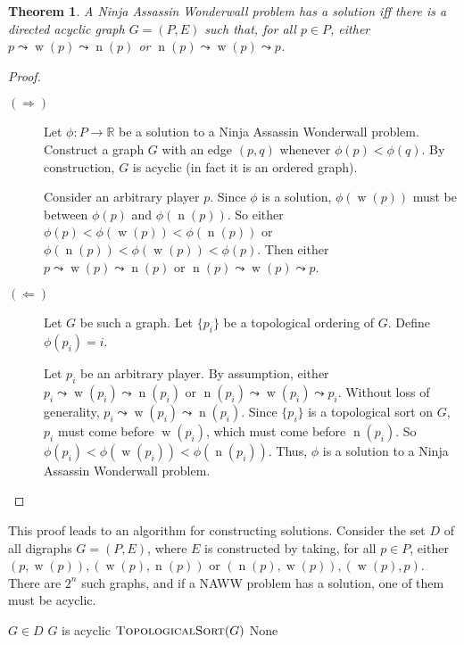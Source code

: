 \documentclass[12pt]{article}
\newtheorem*{thm}{Theorem}
\DeclareMathOperator{\w}{w}
\DeclareMathOperator{\n}{n}
\begin{document}
\begin{thm}
A Ninja Assassin Wonderwall problem has a solution iff there is a directed acyclic graph $G=(P,E)$ such that, for all $p\in P$, either  $p \leadsto \w(p) \leadsto \n(p)$ or $\n(p) \leadsto \w(p) \leadsto p$.
\end{thm}
\begin{proof} \mbox{}

\begin{description}
\item[$(\Rightarrow)$] Let $\phi: P \to \mathbb{R}$ be a solution to a Ninja Assassin Wonderwall problem. Construct a graph $G$ with an edge $(p,q)$ whenever $\phi(p)<\phi(q)$. By construction, $G$ is acyclic (in fact it is an ordered graph).

Consider an arbitrary player $p$. Since $\phi$ is a solution, $\phi(\w(p))$ must be between $\phi(p)$ and $\phi(\n(p))$. So either $\phi(p) < \phi(\w(p)) < \phi(\n(p))$ or $\phi(\n(p)) < \phi(\w(p)) < \phi(p)$. Then either $p \leadsto \w(p) \leadsto \n(p)$ or $\n(p) \leadsto \w(p) \leadsto p$.

\item[$(\Leftarrow)$] Let $G$ be such a graph. Let $\{p_i\}$ be a topological ordering of $G$. Define $\phi(p_i) = i$. 

Let $p_i$ be an arbitrary player. By assumption, either $p_i \leadsto \w(p_i) \leadsto \n(p_i)$ or $\n(p_i) \leadsto \w(p_i) \leadsto p_i$. Without loss of generality, $p_i \leadsto \w(p_i) \leadsto \n(p_i)$. Since $\{p_i\}$ is a topological sort on $G$, $p_i$ must come before $\w(p_i)$, which must come before $\n(p_i)$. So $\phi(p_i) < \phi(\w(p_i)) < \phi(\n(p_i))$. Thus, $\phi$ is a solution to a Ninja Assassin Wonderwall problem.
\end{description}
\end{proof}

This proof leads to an algorithm for constructing solutions. Consider the set $D$ of all digraphs $G=(P,E)$, where $E$ is constructed by taking, for all $p \in P$, either  $(p,\w(p)), (\w(p),\n(p))$ or $(\n(p),\w(p)),(\w(p),p)$. There are $2^n$ such graphs, and if a NAWW problem has a solution, one of them must be acyclic.

\begin{codebox}
\li \For $G\in D$
\li     \Do
        \If $G$ is acyclic
\li         \Do
                \Return $\textnormal{\scshape TopologicalSort}(G)$
        \End
    \End
\li \Return None
\end{codebox}
    
\end{document}
